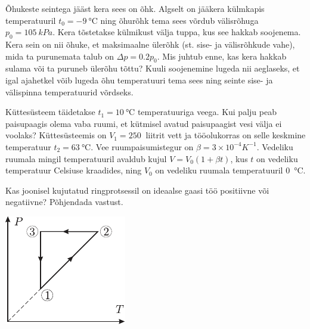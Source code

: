 \documentclass[10pt, twoside]{article}
\begin{document}
{
Õhukeste seintega jääst kera sees on õhk. Algselt on jääkera külmkapis temperatuuril $t_0 = \SI{-9}{\degreeCelsius}$ ning õhurõhk tema sees võrdub välisrõhuga $p_0 = \SI{105}{kPa}$. Kera tõstetakse külmikust välja tuppa, kus see hakkab soojenema. Kera sein on nii õhuke, et maksimaalne ülerõhk (st. sise- ja välisrõhkude vahe), mida ta purunemata talub on $\Delta p = \num{0,2}p_0$. Mis juhtub enne, kas kera hakkab sulama või ta puruneb ülerõhu tõttu? Kuuli soojenemine lugeda nii aeglaseks, et igal ajahetkel võib lugeda õhu temperatuuri tema sees ning seinte sise- ja välispinna temperatuurid võrdseks.
\probend
\bigskip


Küttesüsteem täidetakse $t_1=\SI{10}{\degreeCelsius}$ temperatuuriga veega. Kui palju peab paisupaagis olema vaba ruumi, et kütmisel avatud paisupaagist vesi välja ei voolaks? Küttesüsteemis on $V_1=\SI{250}{}$ liitrit vett ja tööolukorras on selle keskmine temperatuur $t_2=\SI{63}{\degreeCelsius}$. Vee ruumpaisumistegur on $\beta=3\times 10^{-4}K^{-1}$. Vedeliku ruumala mingil temperatuuril avaldub kujul $V=V_{0}(1+\beta t)$, kus $t$ on vedeliku temperatuur Celsiuse kraadides, ning $V_{0}$ on vedeliku ruumala temperatuuril \SI{0}{\degreeCelsius}.
\probend
\bigskip


Kas joonisel kujutatud ringprotsessil on ideaalse gaasi töö positiivne või negatiivne? Põhjendada vastust.

\begin{center}
	\includegraphics[width=0.4\linewidth]{2006-v2g-02-yl}
\end{center}
\probend
\bigskip


}
\end{document}
